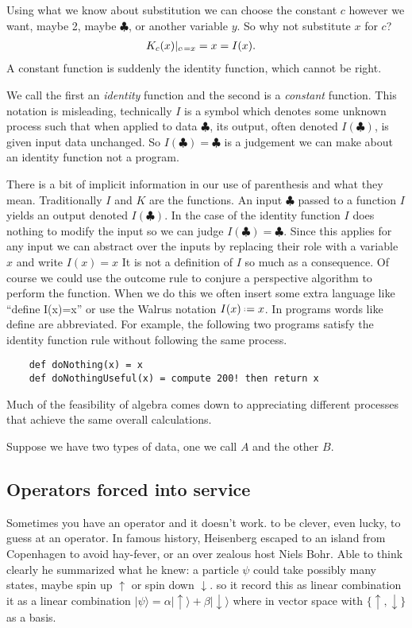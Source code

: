 Using what we know about substitution we can choose the constant $c$
however we want, maybe 2, maybe $\clubsuit$, or another variable $y$.
So why not substitute $x$ for $c$?
\begin{align*}
    K_c(x)|_{c\defeq x} & = x = I(x).
\end{align*}
A constant function is suddenly the identity function, which cannot be 
right.  

We call the first an \emph{identity} function and the second is a \emph{constant}
function.  This notation is misleading, technically $I$ is a symbol
which denotes some unknown process such that when applied to data $\clubsuit$,
its output, often denoted $I(\clubsuit)$, is given input data unchanged.
So $I(\clubsuit)=\clubsuit$ is a judgement we can make about an identity 
function not a program.

There is a bit of implicit information in our use 
of parenthesis and what they mean.  Traditionally $I$ and $K$ are 
the functions.  An input $\clubsuit$ passed to a function $I$ 
yields an output denoted $I(\clubsuit)$.  In the case of the identity 
function $I$ does nothing to modify the input so we can judge 
$I(\clubsuit)=\clubsuit$.  Since this applies for any input we 
can abstract over the inputs by replacing their role with a variable 
$x$ and write $I(x)=x$  It is not a definition of $I$ so much as 
a consequence.  Of course we could use the outcome rule to conjure 
a perspective algorithm to perform the function.  When we do this 
we often insert some extra language like ``define I(x)=x'' or 
use the Walrus notation $I(x)\defeq x$.  In programs words like 
define are abbreviated.  For example, the following two programs satisfy
the identity function rule without following the same process.
\begin{lstlisting}
    def doNothing(x) = x 
    def doNothingUseful(x) = compute 200! then return x
\end{lstlisting}
Much of the feasibility of algebra comes down to appreciating 
different processes that achieve the same overall calculations.


Suppose we have two types of data, one we call $A$ and the other $B$.



\subsection{Operators forced into service}
Sometimes you have an operator and it doesn't work.
to be clever, even lucky, to guess at an operator.
In famous history, Heisenberg escaped to an island from Copenhagen 
to avoid hay-fever, or an over zealous host Niels Bohr. 
Able to think clearly he summarized what he knew: a particle $\psi$
could take possibly many states, maybe spin up $\uparrow$ or spin down 
$\downarrow$.  so it record this as linear combination
it as a linear combination $|\psi\rangle = \alpha|\uparrow\rangle+\beta|\downarrow\rangle$
where in vector space with $\{\uparrow,\downarrow\}$ as a basis. 


